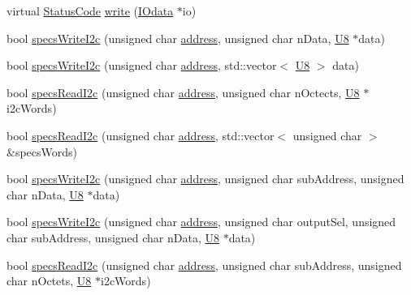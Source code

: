 \begin{DoxyCompactItemize}
\item 
virtual \hyperlink{classStatusCode}{Status\+Code} \hyperlink{classSpecsInterface_a33c7224b61bbb8d1ef20680f570ba4bd}{write} (\hyperlink{classIOdata}{I\+Odata} $\ast$io)
\item 
bool \hyperlink{classSpecsInterface_a20dacf68396a40eadbb740db73ff9624}{specs\+Write\+I2c} (unsigned char \hyperlink{classSpecsInterface_a0fa039a15b842a5ba783ce825b9915d8}{address}, unsigned char n\+Data, \hyperlink{ICECALv3_8h_a3cb25ca6f51f003950f9625ff05536fc}{U8} $\ast$data)
\item 
bool \hyperlink{classSpecsInterface_a00c49357f1f60e3e50de9a51fa127b79}{specs\+Write\+I2c} (unsigned char \hyperlink{classSpecsInterface_a0fa039a15b842a5ba783ce825b9915d8}{address}, std\+::vector$<$ \hyperlink{ICECALv3_8h_a3cb25ca6f51f003950f9625ff05536fc}{U8} $>$ data)
\item 
bool \hyperlink{classSpecsInterface_a7e9a0fe69a998e624ca2d7339b61bcb5}{specs\+Read\+I2c} (unsigned char \hyperlink{classSpecsInterface_a0fa039a15b842a5ba783ce825b9915d8}{address}, unsigned char n\+Octects, \hyperlink{ICECALv3_8h_a3cb25ca6f51f003950f9625ff05536fc}{U8} $\ast$i2c\+Words)
\item 
bool \hyperlink{classSpecsInterface_ab61d866ec9b8a48e84a867004c1ed662}{specs\+Read\+I2c} (unsigned char \hyperlink{classSpecsInterface_a0fa039a15b842a5ba783ce825b9915d8}{address}, std\+::vector$<$ unsigned char $>$ \&specs\+Words)
\item 
bool \hyperlink{classSpecsInterface_a08dff9a17cd6073cd94fbd2cf7340dbd}{specs\+Write\+I2c} (unsigned char \hyperlink{classSpecsInterface_a0fa039a15b842a5ba783ce825b9915d8}{address}, unsigned char sub\+Address, unsigned char n\+Data, \hyperlink{ICECALv3_8h_a3cb25ca6f51f003950f9625ff05536fc}{U8} $\ast$data)
\item 
bool \hyperlink{classSpecsInterface_ae208595624e222a9ff81d112dfbf5a97}{specs\+Write\+I2c} (unsigned char \hyperlink{classSpecsInterface_a0fa039a15b842a5ba783ce825b9915d8}{address}, unsigned char output\+Sel, unsigned char sub\+Address, unsigned char n\+Data, \hyperlink{ICECALv3_8h_a3cb25ca6f51f003950f9625ff05536fc}{U8} $\ast$data)
\item 
bool \hyperlink{classSpecsInterface_acbc22fab91e3dbd33f83b324750baa1f}{specs\+Read\+I2c} (unsigned char \hyperlink{classSpecsInterface_a0fa039a15b842a5ba783ce825b9915d8}{address}, unsigned char sub\+Address, unsigned char n\+Octets, \hyperlink{ICECALv3_8h_a3cb25ca6f51f003950f9625ff05536fc}{U8} $\ast$i2c\+Words)
\item 

\end{DoxyCompactItemize}
